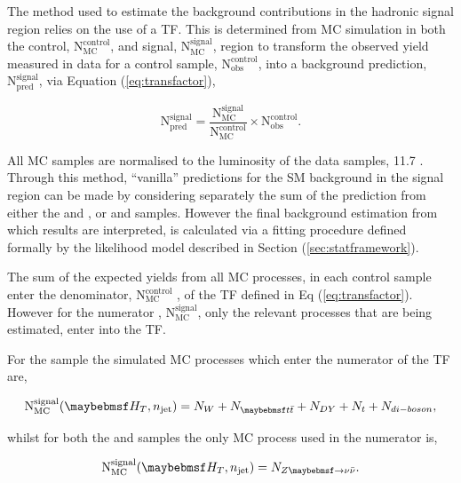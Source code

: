 The method used to estimate the background contributions in the hadronic signal region relies on the use of a \acf{TF}. This is determined from MC simulation in both the control, $\text{N}_{\text{MC}}^{\text{control}}$, and signal, $\text{N}_{\text{MC}}^{\text{signal}}$, region to transform the observed yield measured in data for a control sample,  $\text{N}_{\text{obs}}^{\text{control}}$, into a background prediction, $\text{N}_{\text{pred}}^{\text{signal}}$, via Equation (\ref{eq:transfactor}),

\begin{equation}
\label{eq:transfactor}
\text{N}_{\text{pred}}^{\text{signal}} = \frac{\text{N}_{\text{MC}}^{\text{signal}}}{ \text{N}_{\text{MC}}^{\text{control}}} \times  \text{N}_{\text{obs}}^{\text{control}}.
\end{equation}

All MC samples are normalised to the luminosity of the data samples, 11.7 \fb. Through this method, ``vanilla'' predictions for the \ac{SM} background in the signal region can be made by considering separately the sum of the prediction from either the \mupjets and \gpjets, or \mupjets and \dimupjets samples. However the final background estimation from which results are interpreted, is calculated via a fitting procedure defined formally by the likelihood model described in Section (\ref{sec:statframework}). 

The sum of the expected yields from all MC processes, in each control sample enter the denominator, $\text{N}_{\text{MC}}^{\text{control}}$  , of the \ac{TF} defined in Eq (\ref{eq:transfactor}). However for the numerator , $\text{N}_{\text{MC}}^{\text{signal}}$, only the relevant processes that are being estimated, enter into the \ac{TF}.

For the \mupjets sample the simulated MC processes which enter the numerator of the \ac{TF} are,

\begin{equation} 
\text{N}_{\text{MC}}^{\text{signal}}(\theht,n_{\text{jet}}) = N_{W} + N_{\ttbar} + N_{DY} + N_{t} + N_{di-boson},
\end{equation}

whilst for both the \dimupjets and \gpjets samples the only MC process used in the numerator is,

\begin{equation} 
\text{N}_{\text{MC}}^{\text{signal}}(\theht,n_{\text{jet}}) = N_{\zinv}.
\end{equation}

